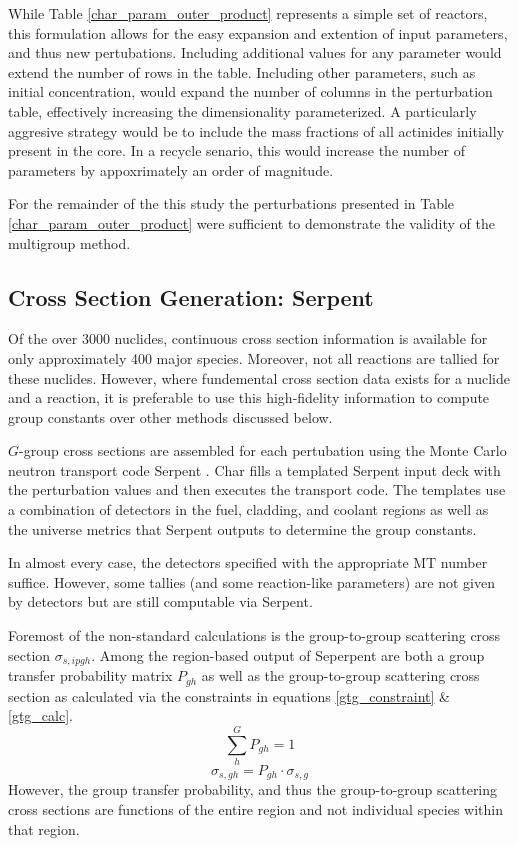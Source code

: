 While Table \ref{char_param_outer_product} represents a simple set of reactors, this formulation 
allows for the easy expansion and extention of input parameters, and thus new pertubations. 
Including additional values for any parameter would extend the number of rows in the table.  
Including other parameters, such as initial  concentration, would expand the number of
columns in the perturbation table, effectively increasing the dimensionality parameterized.
A particularly aggresive strategy would be to include the mass fractions of all actinides initially
present in the core.  In a recycle senario, this would increase the number of parameters by 
appoxrimately an order of magnitude.  

For the remainder of the this study the perturbations presented in Table \ref{char_param_outer_product}
were sufficient to demonstrate the validity of the multigroup method.

\subsection{Cross Section Generation: Serpent}
Of the over 3000 nuclides, continuous cross section information is available for only 
approximately 400 major species.  Moreover, not all reactions are tallied 
for these nuclides.  However, where fundemental cross section data exists for a nuclide
and a reaction, it is preferable to use this high-fidelity information to compute group
constants over other methods discussed below.

$G$-group cross sections are assembled for each pertubation using the Monte Carlo neutron
transport code Serpent \cite{Lepp2011}.  Char fills a templated Serpent input deck with the
perturbation values and then executes the transport code.  The templates use a combination 
of detectors in the fuel, cladding, and coolant regions as well as the universe metrics that 
Serpent outputs to determine the group constants.

In almost every case, the detectors specified with the appropriate MT number suffice.  
However, some tallies (and some reaction-like parameters) are not given by detectors
but are still computable via Serpent.

Foremost of the non-standard calculations is the group-to-group scattering cross section
$\sigma_{s,ipgh}$.  Among the region-based output of Seperpent are both a group transfer
probability matrix $P_{gh}$ as well as the group-to-group scattering cross section
as calculated via the constraints in equations \ref{gtg_constraint} \& \ref{gtg_calc}.
\begin{equation}
\label{gtg_constraint}
\sum_h^G P_{gh} = 1
\end{equation}
\begin{equation}
\label{gtg_calc}
\sigma_{s,gh} = P_{gh} \cdot \sigma_{s,g}
\end{equation}
However, the group transfer probability, and thus the group-to-group scattering cross sections
are functions of the entire region and not individual species within that region.  

